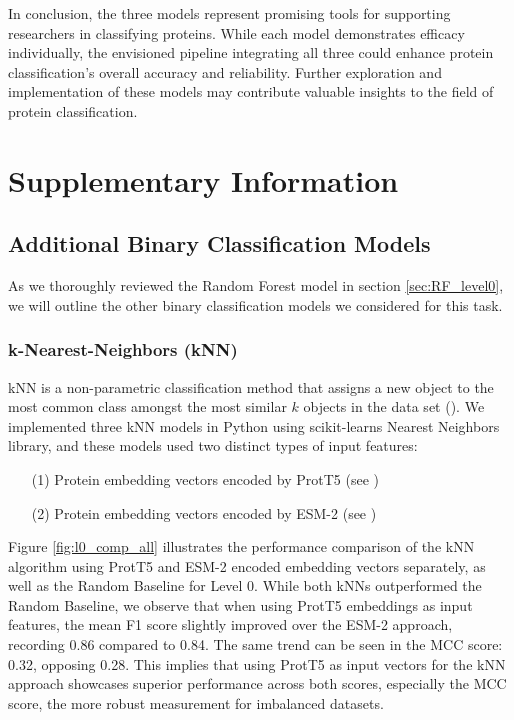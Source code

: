 \documentclass{bioinfo}
\begin{document}
In conclusion, the three models represent promising tools for supporting researchers in classifying proteins. 
While each model demonstrates efficacy individually, the envisioned pipeline integrating all three could enhance protein classification's overall accuracy and reliability.
Further exploration and implementation of these models may contribute valuable insights to the field of protein classification.

\section{Supplementary Information}

\subsection{Additional Binary Classification Models}\label{sec:unused binarys}
As we thoroughly reviewed the Random Forest model in section \ref{sec:RF_level0}, we will outline the other binary classification models we considered for this task.

\subsubsection{k-Nearest-Neighbors (kNN)}
kNN is a non-parametric classification method
that assigns a new object to the most common class amongst the most similar $k$ objects in the data set (\cite{knn_principles}). 
We implemented three kNN models in Python using scikit-learns Nearest Neighbors library, and 
these models used two distinct types of input features:
\begin{enumerate}
	\item[(1)] Protein embedding vectors encoded by ProtT5 (see \cite{ProtT5})
    \item[(2)] Protein embedding vectors encoded by ESM-2 (see \cite{ESM2})
\end{enumerate}
Figure \ref{fig:l0_comp_all} illustrates the performance comparison of the kNN algorithm using ProtT5 and ESM-2 encoded
embedding vectors separately, as well as the Random Baseline for Level 0.
While both kNNs outperformed the Random Baseline, we observe that when using ProtT5 embeddings as input features, 
the mean F1 score slightly improved over the ESM-2 approach, recording 0.86 compared to 0.84.
The same trend can be seen in the MCC score: 0.32, opposing 0.28. 
This implies that using ProtT5 as input vectors for the kNN approach showcases superior performance across both scores, 
especially the MCC score, the more robust measurement for imbalanced datasets. 
\end{document}
